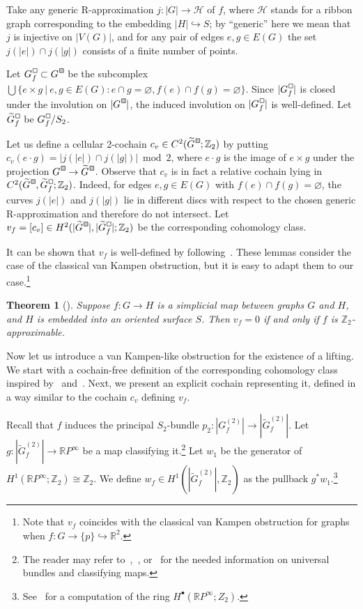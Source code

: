 \documentclass[a4paper,12pt,reqno,oneside]{amsart}
\theoremstyle{plain}
\newtheorem{theorem}{Theorem}
\theoremstyle{definition}
\theoremstyle{plain}
\newcommand{\from}{\colon}
\newcommand{\wt}[1]{\widetilde{#1}}
\newcommand{\R}{\mathbb{R}}
\newcommand{\RP}{\mathbb{R}P}
\newcommand{\Z}{\mathbb{Z}}
\newcommand{\HH}{\mathcal{H}}
\newcommand{\gbox}{\tikz{\node[shape=rectangle,fill=black!20,draw,inner sep=0.7mm,align=center] (char) {};}}
\newcommand{\wbox}{\tikz{\node[shape=rectangle,draw,inner sep=0.7mm,align=center] (char) {};}}
\newcommand*\Gc{G^{\hspace{1pt}\raisebox{0.8pt}{\gbox}}}
\newcommand*\wGc{\wt{G}^{\hspace{1pt}\raisebox{0.8pt}{\gbox}}}
\newcommand*\Gcf{G^{\hspace{1pt}\raisebox{0.8pt}{\wbox}}_{f}}
\newcommand*\wGcf{\wt{G}^{\hspace{1pt}\raisebox{0.8pt}{\wbox}}_{f}}
\begin{document}
Take any generic R-approximation
$j \from |G| \to \HH$ of $f$, where $\HH$ stands for a ribbon graph corresponding to the embedding
$|H| \hookrightarrow S$; by ``generic'' here we mean that $j$ is injective on $|V(G)|$, and for any
pair of edges $e, g \in E(G)$ the set $j(|e|) \cap j(|g|)$ consists of a finite number of points.

Let $\Gcf \subset \Gc$ be the subcomplex
$\bigcup \{ e \times g\ |\ e, g \in E(G) \colon e \cap g = \varnothing, f(e) \cap f(g) = \varnothing
\}$. Since $|\Gcf|$ is closed under the involution on $|\Gc|$, the induced involution on
$|\Gcf|$ is well-defined. Let $\wGcf$ be $\Gcf / S_2$.

Let us define a cellular 2-cochain $c_v \in C^2(\wGc; \Z_2)$ by putting
$c_v(e \cdot g) = |j(|e|) \cap j(|g|)| \bmod{2}$, where $e \cdot g$ is the image of $e \times g$
under the projection $\Gc \to \wGc$. Observe that $c_v$ is in fact a relative cochain lying in
$C^2(\wGc, \wGcf; \Z_2)$. Indeed, for edges $e, g \in E(G)$ with
$f(e) \cap f(g) = \varnothing$, the curves $j(|e|)$ and $j(|g|)$ lie in different discs with respect
to the chosen generic R-approximation and therefore do not intersect. Let
$v_f = [c_v] \in H^2(|\wGc|, |\wGcf|; \Z_2)$ be the corresponding cohomology class.

It can be shown that $v_f$ is well-defined by following~\cite[Lemmas 3.2--3.5]{shapiro}. These lemmas
consider the case of the classical van Kampen obstruction, but it is easy to adapt them to our
case.\footnote{Note that $v_{f}$ coincides with the classical van Kampen obstruction for graphs when $f
  \from G \to \{p\} \hookrightarrow \R^2$.}

\begin{theorem}[{\cite[Proposition 3.1]{skop}}]\label{thm:z2_approx}
  Suppose $f \from G \to H$ is a simplicial map between graphs $G$ and $H$, and $H$ is embedded into an
  oriented surface $S$. Then $v_f = 0$ if and only if $f$ is $\Z_2$-approximable.
\end{theorem}

Now let us introduce a van Kampen-like obstruction for the existence of a lifting. We start with a
cochain-free definition of the corresponding cohomology class inspired by~\cite{bestvina}
and~\cite{mel_van_kampen}. Next, we present an explicit cochain representing it, defined in a way
similar to the cochain $c_{v}$ defining $v_f$.

Recall that $f$ induces the principal $S_2$-bundle $p_2 \from |G^{(2)}_f| \to |\wt{G}^{(2)}_f|$. Let
$g \from |\wt{G}^{(2)}_f| \to \RP^{\infty}$ be a map classifying it.\footnote{The reader may refer
  to~\cite{principal_bundles},~\cite{milnor_stasheff}, or~\cite{hatcher_bundles} for the needed information on
  universal bundles and classifying maps.} Let $w_1$ be the generator of
$H^1(\RP^{\infty}; \Z_2) \cong \Z_2$. We define $w_f \in H^1(|\wt{G}^{(2)}_f|, \Z_2)$ as the pullback
$g^* w_1$.\footnote{{See~\cite[Theorem 7.1]{milnor_stasheff} for a computation of the ring
  $H^\bullet(\RP^\infty; Z_2)$.}}
\end{document}
